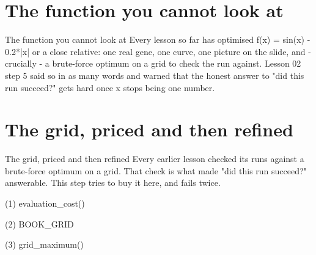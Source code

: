 \section{The function you cannot look at}

\begin{frame}{The function you cannot look at}
Every lesson so far has optimised f(x) = sin(x) - 0.2*|x| or a close relative:
one real gene, one curve, one picture on the slide, and - crucially - a
brute-force optimum on a grid to check the run against. Lesson 02 step 5 said so
in as many words and warned that the honest answer to "did this run succeed?"
gets hard once x stops being one number.
\end{frame}


\section{The grid, priced and then refined}

\begin{frame}{The grid, priced and then refined}
Every earlier lesson checked its runs against a brute-force optimum on a grid.
That check is what made "did this run succeed?" answerable. This step tries to
buy it here, and fails twice.
\end{frame}

\begin{frame}[fragile]{(1) evaluation\_cost()}

\end{frame}

\begin{frame}[fragile]{(2) BOOK\_GRID}

\end{frame}

\begin{frame}[fragile]{(3) grid\_maximum()}

\end{frame}

